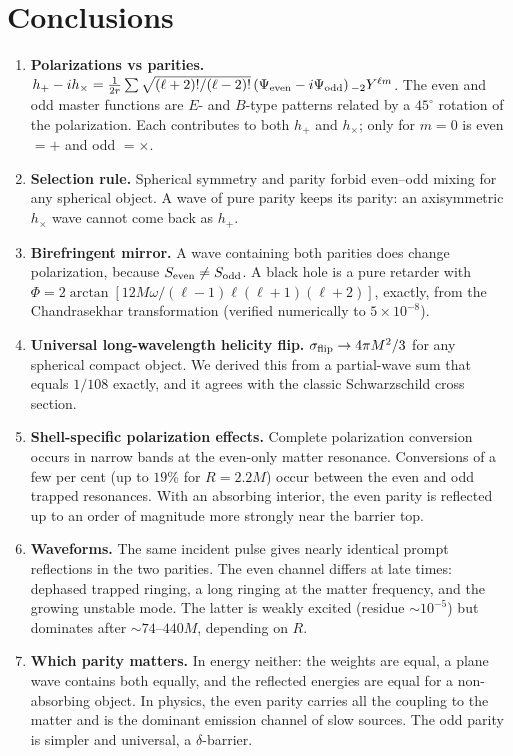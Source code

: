 \section{Conclusions}\label{sec:concl}
\begin{enumerate}
\item \textbf{Polarizations vs parities.} $h_+-ih_\times=\frac1{2r}\sum\sqrt{(\ell+2)!/(\ell-2)!}\,(\Psi_{\rm even}-i\Psi_{\rm odd})\,{}_{-2}Y^{\ell m}$. The even
and odd master functions are $E$- and $B$-type patterns related by a $45^\circ$ rotation of the polarization. Each
contributes to both $h_+$ and $h_\times$; only for $m=0$ is even $=+$ and odd $=\times$.
\item \textbf{Selection rule.} Spherical symmetry and parity forbid even--odd mixing for any spherical object. A wave of
pure parity keeps its parity: an axisymmetric $h_\times$ wave cannot come back as $h_+$.
\item \textbf{Birefringent mirror.} A wave containing both parities does change polarization, because
$S_{\rm even}\ne S_{\rm odd}$. A black hole is a pure retarder with $\Phi=2\arctan[12M\omega/(\ell-1)\ell(\ell+1)(\ell+2)]$, exactly,
from the Chandrasekhar transformation (verified numerically to $5\times10^{-8}$).
\item \textbf{Universal long-wavelength helicity flip.} $\sigma_{\rm flip}\to4\pi M^2/3$ for any spherical compact object. We
derived this from a partial-wave sum that equals $1/108$ exactly, and it agrees with the classic Schwarzschild cross
section.
\item \textbf{Shell-specific polarization effects.} Complete polarization conversion occurs in narrow bands at the even-only
matter resonance. Conversions of a few per cent (up to $19\%$ for $R=2.2M$) occur between the even and odd trapped
resonances. With an absorbing interior, the even parity is reflected up to an order of magnitude more strongly near the
barrier top.
\item \textbf{Waveforms.} The same incident pulse gives nearly identical prompt reflections in the two parities. The even
channel differs at late times: dephased trapped ringing, a long ringing at the matter frequency, and the growing unstable
mode. The latter is weakly excited (residue $\sim10^{-5}$) but dominates after $\sim74$--$440M$, depending on $R$.
\item \textbf{Which parity matters.} In energy neither: the weights are equal, a plane wave contains both equally, and the
reflected energies are equal for a non-absorbing object. In physics, the even parity carries all the coupling to the
matter and is the dominant emission channel of slow sources. The odd parity is simpler and universal, a $\delta$-barrier.
\end{enumerate}


